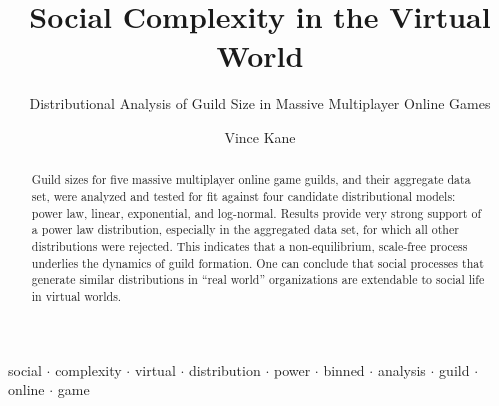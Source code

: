 \documentclass[pdftex,12pt]{llncs}
\begin{document}
\title{Social Complexity in the Virtual World}
\subtitle{Distributional Analysis of Guild Size in Massive Multiplayer Online Games}
\author{Vince Kane}

\maketitle

\begin{abstract}
Guild sizes for five massive multiplayer online game guilds, and their aggregate data set, were analyzed and tested for fit against four candidate distributional models:  power law, linear, exponential, and log-normal.
Results provide very strong support of a power law distribution, especially in the aggregated data set, for which all other distributions were rejected.
This indicates that a non-equilibrium, scale-free process underlies the dynamics of guild formation.
One can conclude that social processes that generate similar distributions in “real world” organizations are extendable to social life in virtual worlds.
\end{abstract}

\begin{small}
\begin{keywords}
{social $\cdot$ complexity $\cdot$ virtual $\cdot$ distribution $\cdot$ power $\cdot$ binned $\cdot$ analysis $\cdot$ guild $\cdot$ online $\cdot$ game}
\end{keywords}
\end{small}
\end{document}
